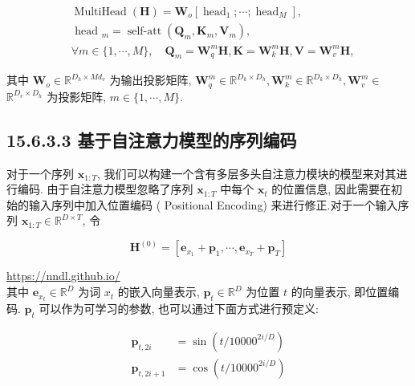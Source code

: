 \documentclass[10pt]{article}
\begin{document}
$$
\begin{aligned}
& \operatorname{MultiHead}(\boldsymbol{H})=\boldsymbol{W}_{o}\left[\operatorname{head}_{1} ; \cdots ; \operatorname{head}_{M}\right] \text {, } \\
& \text { head }_{m}=\operatorname{self-att}\left(\boldsymbol{Q}_{m}, \boldsymbol{K}_{m}, \boldsymbol{V}_{m}\right), \\
& \forall m \in\{1, \cdots, M\}, \quad \boldsymbol{Q}_{m}=\boldsymbol{W}_{q}^{m} \boldsymbol{H}, \boldsymbol{K}=\boldsymbol{W}_{k}^{m} \boldsymbol{H}, \boldsymbol{V}=\boldsymbol{W}_{v}^{m} \boldsymbol{H},
\end{aligned}
$$

其中 $\boldsymbol{W}_{o} \in \mathbb{R}^{D_{h} \times M d_{v}}$ 为输出投影矩阵, $\boldsymbol{W}_{q}^{m} \in \mathbb{R}^{D_{k} \times D_{h}}, \boldsymbol{W}_{k}^{m} \in \mathbb{R}^{D_{k} \times D_{h}}, \boldsymbol{W}_{v}^{m} \in$ $\mathbb{R}^{D_{v} \times D_{h}}$ 为投影矩阵, $m \in\{1, \cdots, M\}$.

\subsection*{15.6.3.3 基于自注意力模型的序列编码}
对于一个序列 $\boldsymbol{x}_{1: T}$, 我们可以构建一个含有多层多头自注意力模块的模型来对其进行编码. 由于自注意力模型忽略了序列 $\boldsymbol{x}_{1: T}$ 中每个 $\boldsymbol{x}_{t}$ 的位置信息, 因此需要在初始的输入序列中加入位置编码 ( Positional Encoding) 来进行修正.对于一个输入序列 $\boldsymbol{x}_{1: T} \in \mathbb{R}^{D \times T}$, 令


\begin{equation*}
\boldsymbol{H}^{(0)}=\left[\boldsymbol{e}_{x_{1}}+\boldsymbol{p}_{1}, \cdots, \boldsymbol{e}_{x_{T}}+\boldsymbol{p}_{T}\right] \tag{15.112}
\end{equation*}


\href{https://nndl.github.io/}{https://nndl.github.io/}\\
其中 $\boldsymbol{e}_{x_{t}} \in \mathbb{R}^{D}$ 为词 $x_{t}$ 的嵌入向量表示, $\boldsymbol{p}_{t} \in \mathbb{R}^{D}$ 为位置 $t$ 的向量表示, 即位置编码. $\boldsymbol{p}_{t}$ 可以作为可学习的参数, 也可以通过下面方式进行预定义:


\begin{align*}
\boldsymbol{p}_{t, 2 i} & =\sin \left(t / 10000^{2 i / D}\right)  \tag{15.113}\\
\boldsymbol{p}_{t, 2 i+1} & =\cos \left(t / 10000^{2 i / D}\right) \tag{15.114}
\end{align*}
\end{document}
